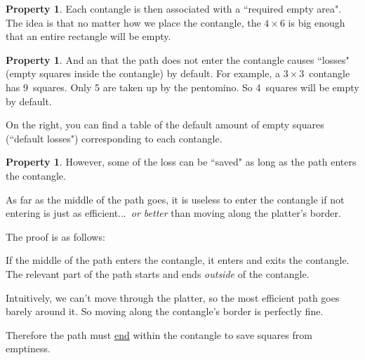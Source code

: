 \documentclass{article}
\newcommand{\highlight}[1]{\uline{#1}}
\newcommand{\alert}[1]{\marginnote{\textcolor{red}{#1}}}
\newcommand{\authornote}[1]{\marginnote{\textcolor{authorcolor}{#1}}}
\theoremstyle{definition}%
\newtheorem{property}[theorem]{Property}
\newcommand{\badterm}[1]{\textcolor{red}{\uwave{\textcolor{black}{#1}}}}
\begin{document}
\begin{property}
Each contangle is then associated with a ``required empty area".
The idea is that no matter how we place the contangle, the $4 \times 6$ is big enough
that an entire rectangle will be empty.
\end{property}


\alert{This layout is really fragile!}
\vspace{0.4em}
\noindent
\begin{minipage}{300pt}
\begin{property}
And an \badterm{assumption} that the path does not enter the contangle causes ``losses" (empty squares inside the contangle) by default.
For example, a $3 \times 3$~contangle has 9~squares. Only 5 are taken up by the pentomino.
So 4~squares will be empty by default.

\hspace{1em}
On the right, you can find a table of the default amount of empty squares (``default losses") corresponding to each contangle.
\end{property}
\end{minipage}

\vspace{-4.45em}
\begin{flushright}
\end{flushright}
\vspace{2em}

\begin{property}
However, some of the loss can be ``saved" as long as the path enters the contangle.\marginnote{Breaking the \badterm{assumption}.}

As far as the middle of the path goes, it is useless to enter the contangle if
not entering is just as efficient...\ \emph{or better} than moving along the platter's border.

The proof is as follows:

If the middle of the path enters the contangle, it enters and exits the contangle. The relevant part of the path starts and ends \emph{outside} of the contangle.\authornote{A path has two ends in this paper, not a start and end. But sure.}

Intuitively, we can't move through the platter, so the most efficient path goes barely around it. So moving along the contangle's border is perfectly fine.

Therefore the path must \highlight{end} within the contangle to save squares \textcolor{white!50!authorcolor}{from emptiness}.
\end{property}
\end{document}
